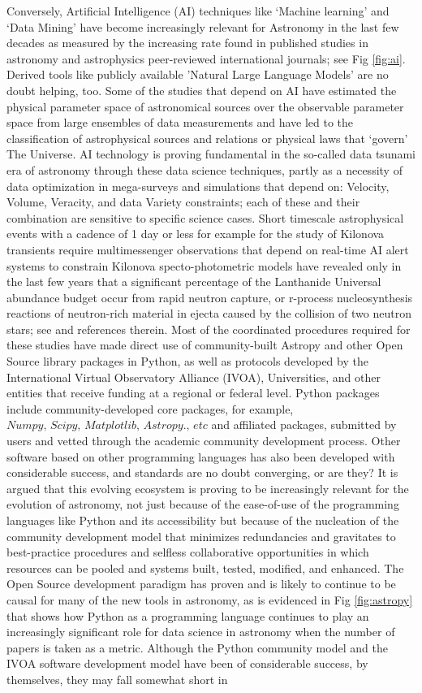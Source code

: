 \documentclass[final,5p,times,twocolumn,authoryear]{elsarticle}
\begin{document}
Conversely, Artificial Intelligence (AI) techniques like `Machine learning' and `Data Mining' have become increasingly relevant for Astronomy in the last few decades as measured by the increasing rate found in published studies in astronomy and astrophysics peer-reviewed international journals; see Fig \ref{fig:ai}.  Derived tools like publicly available 'Natural Large Language Models' are no doubt helping, too. Some of the studies that depend on AI have estimated the physical parameter space of astronomical sources over the observable parameter space from large ensembles of data measurements and have led to the classification of astrophysical sources and relations or physical laws that `govern' The Universe. AI technology is proving fundamental in the so-called data tsunami era of astronomy through these data science techniques, partly as a necessity of data optimization in mega-surveys and simulations that depend on: Velocity, Volume, Veracity, and data Variety constraints; each of these and their combination are sensitive to specific science cases. Short timescale astrophysical events with a cadence of 1 day or less for example for the study of Kilonova transients require multimessenger observations that depend on real-time AI alert systems to constrain Kilonova specto-photometric models have revealed only in the last few years that a significant percentage of the Lanthanide Universal abundance budget occur from rapid neutron capture, or r-process nucleosynthesis reactions of neutron-rich material in ejecta caused by the collision of two neutron stars; see \cite{artola2020} and references therein. Most of the coordinated procedures required for these studies have made direct use of community-built Astropy and other Open Source library packages in Python, as well as protocols developed by the International Virtual Observatory Alliance (IVOA), Universities, and other entities that receive funding at a regional or federal level. Python packages include community-developed core packages, for example, $\textit{Numpy, Scipy, Matplotlib, Astropy., etc}$  and affiliated packages, submitted by users and vetted through the academic community development process. Other software based on other programming languages has also been developed with considerable success, and standards are no doubt converging, or are they? It is argued that this evolving ecosystem is proving to be increasingly relevant for the evolution of astronomy, not just because of the ease-of-use of the programming languages like Python and its accessibility but because of the nucleation of the community development model that minimizes redundancies and gravitates to best-practice procedures and selfless collaborative opportunities in which resources can be pooled and systems built, tested, modified, and enhanced. The Open Source development paradigm has proven and is likely to continue to be causal for many of the new tools in astronomy, as is evidenced in Fig \ref{fig:astropy} that shows how Python as a programming language continues to play an increasingly significant role for data science in astronomy when the number of papers is taken as a metric.  Although the Python community model and the IVOA software development model have been of considerable success, by themselves, they may fall somewhat short in 
\end{document}
